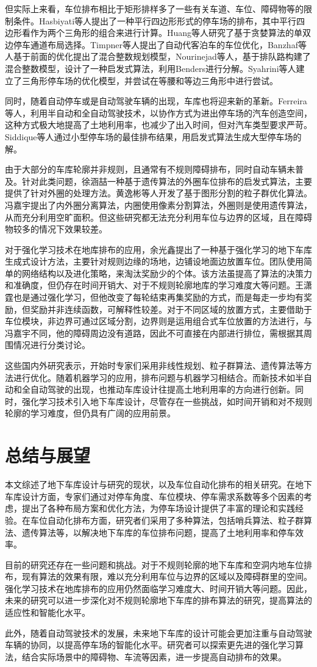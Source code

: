 但实际上来看，车位排布相比于矩形排样多了一些有关车道、车位、障碍物等的限制条件。Hasbiyati\cite{hasbiyati2019parking}等人提出了一种平行四边形形式的停车场的排布，其中平行四边形看作为两个三角形的组合来进行计算。Huang\cite{huang2020general}等人研究了基于贪婪算法的单双边停车通道布局选择。Timpner\cite{timpner2015k}等人提出了自动代客泊车的车位优化，Banzhaf\cite{banzhaf2017high}等人基于前面的优化提出了混合整数规划模型，Nourinejad\cite{nourinejad2018designing}等人，基于排队路构建了混合整数模型，设计了一种启发式算法，利用Benders进行分解。Syahrini\cite{syahrini2018mathematical}等人建立了三角形停车场的优化模型，并尝试在等腰和等边三角形中进行尝试。

同时，随着自动停车或是自动驾驶车辆的出现，车库也将迎来新的革新。Ferreira\cite{ferreira2014self}等人，利用半自动和全自动驾驶技术，以协作方式为进出停车场的汽车创造空间，这种方式极大地提高了土地利用率，也减少了出入时间，但对汽车类型要求严苛。Siddique\cite{siddique2021puzzle}等人通过小型停车场的最佳排布结果，用启发式算法生成大型停车场的解。

由于大部分的车库轮廓并非规则，且通常有不规则障碍排布，同时自动车辆未普及。针对此类问题，徐涵喆\cite{1020726891.nh}一种基于遗传算法的外圈车位排布的启发式算法，主要提供了针对外圈的处理方法。黄逸彬等人\cite{BJYD202004002}开发了基于图形分割的粒子群优化算法。冯嘉宇\cite{1022674189.nh}提出了内外圈分离算法，内圈使用像素分割算法，外圈则是使用遗传算法，从而充分利用空旷面积。但这些研究都无法充分利用车位与边界的区域，且在障碍物较多的情况下效果较差。

对于强化学习技术在地库排布的应用，余光鑫\cite{1020332216.nh}提出了一种基于强化学习的地下车库生成式设计方法，主要针对规则边缘的场地，边铺设地面边放置车位。团队使用简单的网络结构以及进化策略，来淘汰奖励少的个体。该方法虽提高了算法的决策力和准确度，但仍存在时间开销大、对于不规则轮廓地库的学习难度大等问题。王潇霆\cite{1023719817.nh}也是通过强化学习，但他改变了每轮结束再集奖励的方式，而是每走一步均有奖励，但奖励并非连续函数，可解释性较差。对于不同区域的放置方式，主要借助于车位模块，非边界可通过区域分割，边界则是运用组合式车位放置的方法进行，与冯嘉宇不同，他的障碍周边没有道路，因此不可直接在内部进行排位，需根据其周围情况进行分类讨论。

这些国内外研究表示，开始时专家们采用非线性规划、粒子群算法、遗传算法等方法进行优化。随着机器学习的应用，排布问题与机器学习相结合。而新技术如半自动和全自动驾驶的出现，也推动车库设计往提高土地利用率的方向进行创新。同时，强化学习技术引入地下车库设计，尽管存在一些挑战，如时间开销和对不规则轮廓的学习难度，但仍具有广阔的应用前景。
\section{总结与展望}
本文综述了地下车库设计与研究的现状，以及车位自动化排布的相关研究。在地下车库设计方面，专家们通过对停车角度、车位模块、停车需求系数等多个因素的考虑，提出了各种布局方案和优化方法，为停车场设计提供了丰富的理论和实践经验。在车位自动化排布方面，研究者们采用了多种算法，包括哨兵算法、粒子群算法、遗传算法等，以解决地下车库的车位排布问题，提高了土地利用率和停车效率。

目前的研究还存在一些问题和挑战。对于不规则轮廓的地下车库和空洞内地车位排布，现有算法的效果有限，难以充分利用车位与边界的区域以及障碍群里的空间。强化学习技术在地库排布的应用仍然面临学习难度大、时间开销大等问题。因此，未来的研究可以进一步深化对不规则轮廓地下车库的排布算法的研究，提高算法的适应性和智能化水平。

此外，随着自动驾驶技术的发展，未来地下车库的设计可能会更加注重与自动驾驶车辆的协同，以提高停车场的智能化水平。研究者可以探索更先进的强化学习算法，结合实际场景中的障碍物、车流等因素，进一步提高自动排布的效果。